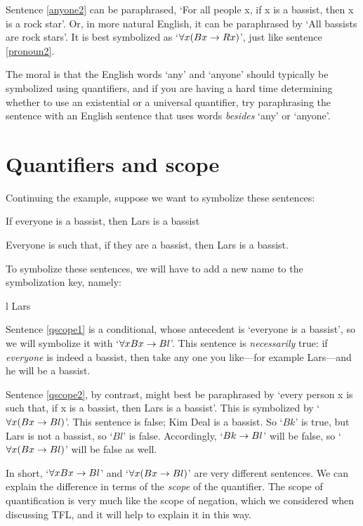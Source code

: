 Sentence \ref{anyone2} can be paraphrased, `For all people x, if x is a bassist, then x is a rock star'. Or, in more natural English, it can be paraphrased by `All bassists are rock stars'. It is best symbolized as `$\forall x(Bx \rightarrow Rx)$', just like sentence \ref{pronoun2}.

The moral is that the English words `any' and `anyone' should typically be symbolized using quantifiers, and if you are having a hard time determining whether to use an existential or a universal quantifier, try paraphrasing the sentence with an English sentence that uses words \emph{besides} `any' or `anyone'.



\section{Quantifiers and scope}
Continuing the example, suppose we want to symbolize these sentences:
	\begin{earg}
		\item[\ex{qscope1}] If everyone is a bassist, then Lars is a bassist
		\item[\ex{qscope2}] Everyone is such that, if they are a bassist, then Lars is a bassist.
	\end{earg}
To symbolize these sentences, we will have to add a new name to the symbolization key, namely:
	\begin{ekey}
		\item[l] Lars
	\end{ekey}
Sentence \ref{qscope1} is a conditional, whose antecedent is `everyone is a bassist', so we will symbolize it with `$\forall x Bx \rightarrow Bl$'. This sentence is \emph{necessarily} true: if \emph{everyone} is indeed a bassist, then take any one you like---for example Lars---and he will be a bassist. 

Sentence \ref{qscope2}, by contrast, might best be paraphrased by `every person x is such that, if x is a bassist, then Lars is a bassist'. This is symbolized by `$\forall x (Bx \rightarrow Bl)$'. This sentence is false; Kim Deal is a bassist. So `$Bk$' is true, but Lars is not a bassist, so `$Bl$' is false. Accordingly, `$Bk \rightarrow Bl$' will be false, so `$\forall x (Bx \rightarrow Bl)$' will be false as well. 

In short, `$\forall x Bx \rightarrow Bl$' and `$\forall x (Bx \rightarrow Bl)$' are very different sentences. We can explain the difference in terms of the \emph{scope} of the quantifier. The scope of quantification is very much like the scope of negation, which we considered when discussing TFL, and it will help to explain it in this way.

